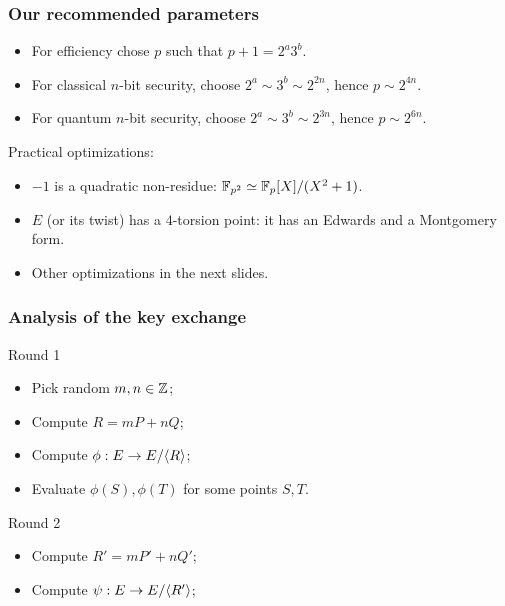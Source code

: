 \documentclass{beamer}
\begin{document}
\begin{frame}
  \frametitle{Our recommended parameters}
  
  \begin{itemize}
  \item For efficiency chose $p$ such that \alert{$p+1 = 2^a3^b$}.
  \item For classical $n$-bit security, choose \alert{$2^a\sim3^b\sim2^{2n}$}, hence \alert{$p\sim2^{4n}$}.
  \item For quantum $n$-bit security, choose \alert{$2^a\sim3^b\sim2^{3n}$}, hence \alert{$p\sim2^{6n}$}.
  \end{itemize}

  \begin{block}{Practical optimizations:}
    \begin{itemize}
    \item $-1$ is a quadratic non-residue: \alert{$\mathbb{F}_{p^2}\simeq\mathbb{F}_p[X]/(X^2+1)$}.
    \item $E$ (or its twist) has a $4$-torsion point: it has an
      \alert{Edwards} and a \alert{Montgomery} form.
    \item Other optimizations in the next slides.
    \end{itemize}
  \end{block}

\end{frame}


\begin{frame}
  \frametitle{Analysis of the key exchange}
  
  \begin{block}{Round 1}
    \begin{itemize}
    \item Pick random \alert{$m,n\in\mathbb{Z}$};
    \item Compute \alert{$R = mP + nQ$};
    \item Compute \alert{$\phi : E \to E/{\langle R \rangle}$};
    \item Evaluate \alert{$\phi(S), \phi(T)$} for some points $S,T$.
    \end{itemize}
  \end{block}
  
  \begin{block}{Round 2}
    \begin{itemize}
    \item Compute \alert{$R' = mP' + nQ'$};
    \item Compute \alert{$\psi : E \to E/{\langle R' \rangle}$};
    \end{itemize}
  \end{block}
\end{frame}
\end{document}
